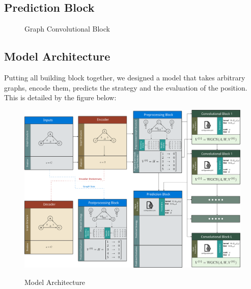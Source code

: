 \subsection{Prediction Block}
\begin{figure}[H]
	\noindent
	
	\caption{Graph Convolutional Block}
	\label{fig:PredictionBlock}
\end{figure}
\subsection{Model Architecture}
Putting all building block together, we designed a model that takes arbitrary graphs, encode them, predicts the strategy and the evaluation of the position.
\newline This is detailed by the figure below:
\newpage
\begin{landscape}

	\begin{figure}[H]
	\centering
		
		{\includegraphics[height=0.95\textheight]{Figures/Architecture.png}}
		\caption{Model Architecture}
		\label{fig:ModelArchitecture}
	\end{figure}
	
\end{landscape}
